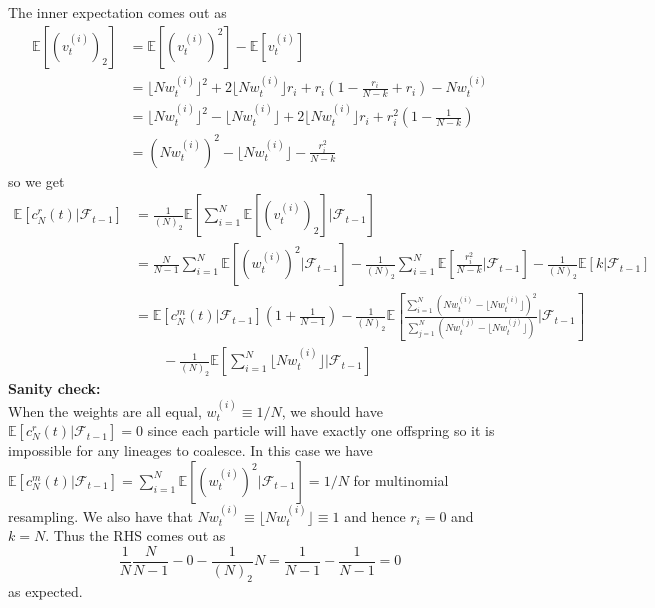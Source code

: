 \documentclass[fleqn]{article}
\newcommand{\E}{\mathbb{E}}
\newcommand{\F}{\mathcal{F}_{t-1}}
\newcommand{\vt}[2][t]{v_{#1}^{(#2)}}
\newcommand{\wt}[2][t]{w_{#1}^{(#2)}}
\begin{document}
The inner expectation comes out as
\begin{align*}
\E[(\vt{i})_2] &= \E[(\vt{i})^2] - \E[\vt{i}] \\
&= \lfloor N\wt{i} \rfloor^2 + 2\lfloor N\wt{i} \rfloor r_i + r_i \left(1 - \frac{r_i}{N-k} + r_i \right) - N\wt{i} \\
&= \lfloor N\wt{i} \rfloor^2 - \lfloor N\wt{i} \rfloor + 2\lfloor N\wt{i} \rfloor r_i + r_i^2 \left(1- \frac{1}{N-k} \right) \\
&= (N\wt{i})^2 - \lfloor N\wt{i} \rfloor - \frac{r_i^2}{N-k}
\end{align*}
so we get
\begin{align*}
\E[c^r_N(t) |\F] &=  \frac{1}{(N)_2} \E\left[ \sum_{i=1}^{N} \E[(\vt{i})_2] |\F \right] \\
&= \frac{N}{N-1} \sum_{i=1}^{N} \E[(\wt{i})^2 |\F] - \frac{1}{(N)_2} \sum_{i=1}^{N} \E\left[ \frac{r_i^2}{N-k} |\F \right] - \frac{1}{(N)_2} \E[k |\F] \\
&= \E[c^{m}_N(t) |\F] \left( 1 + \frac{1}{N-1} \right) - \frac{1}{(N)_2}  \E\left[ \frac{\sum_{i=1}^{N} (N\wt{i} - \lfloor N\wt{i}\rfloor)^2}{\sum_{j=1}^{N} (N\wt{j} - \lfloor N\wt{j}\rfloor)} |\F \right] \\
&\qquad -\frac{1}{(N)_2} \E \left[ \sum_{i=1}^{N} \lfloor N\wt{i}\rfloor |\F \right]
\end{align*}
\textbf{Sanity check:}\\
When the weights are all equal, $\wt{i} \equiv 1/N$, we should have $\E[c^r_N(t) |\F] = 0$ since each particle will have exactly one offspring so it is impossible for any lineages to coalesce. In this case we have $\E[c^{m}_N(t) |\F] = \sum_{i=1}^{N} \E[(\wt{i})^2 |\F] = 1/N$ for multinomial resampling. We also have that $N\wt{i} \equiv \lfloor N\wt{i} \rfloor \equiv 1$ and hence $r_i = 0$ and $k=N$. Thus the RHS comes out as
\begin{equation*}
\frac{1}{N}\frac{N}{N-1} - 0 - \frac{1}{(N)_2} N = \frac{1}{N-1} - \frac{1}{N-1} = 0
\end{equation*}
as expected.
\end{document}
